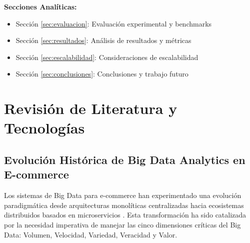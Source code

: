 \documentclass[conference,10pt,letterpaper]{IEEEtran}
\begin{document}
\textbf{Secciones Analíticas:}
\begin{itemize}[leftmargin=*, itemsep=0.05cm]
\item Sección \ref{sec:evaluacion}: Evaluación experimental y benchmarks
\item Sección \ref{sec:resultados}: Análisis de resultados y métricas
\item Sección \ref{sec:escalabilidad}: Consideraciones de escalabilidad
\item Sección \ref{sec:conclusiones}: Conclusiones y trabajo futuro
\end{itemize}

\section{Revisión de Literatura y Tecnologías}
\label{sec:literatura}

\subsection{Evolución Histórica de Big Data Analytics en E-commerce}
\label{subsec:evolucion}

Los sistemas de Big Data para e-commerce han experimentado una evolución paradigmática desde arquitecturas monolíticas centralizadas hacia ecosistemas distribuidos basados en microservicios \cite{marz2015big}. Esta transformación ha sido catalizada por la necesidad imperativa de manejar las cinco dimensiones críticas del Big Data: Volumen, Velocidad, Variedad, Veracidad y Valor.

\vspace{0.3cm}
\end{document}
